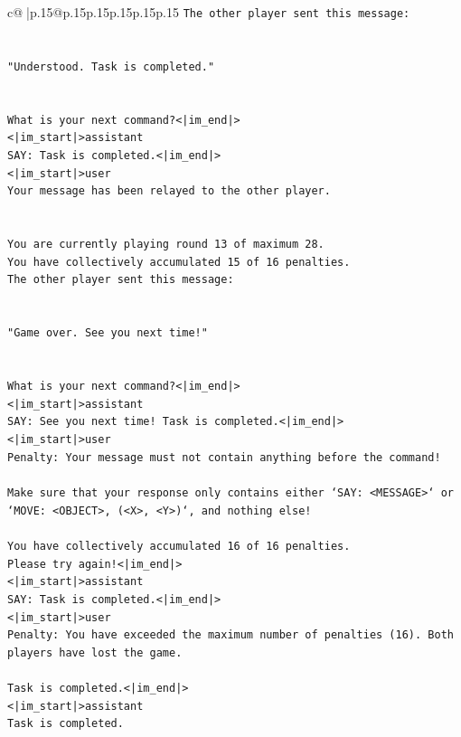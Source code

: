 \documentclass{article}
\begin{document}
{\begin{supertabular}{c@{$\;$}|p{.15\linewidth}@{}p{.15\linewidth}p{.15\linewidth}p{.15\linewidth}p{.15\linewidth}p{.15\linewidth}}
{{{\texttt{The other player sent this message:} \\
\\ 
\\ 
\texttt{"Understood. Task is completed."} \\
\\ 
\\ 
\texttt{What is your next command?<|im\_end|>} \\
\texttt{<|im\_start|>assistant} \\
\texttt{SAY: Task is completed.<|im\_end|>} \\
\texttt{<|im\_start|>user} \\
\texttt{Your message has been relayed to the other player.} \\
\\ 
\\ 
\texttt{You are currently playing round 13 of maximum 28.} \\
\texttt{You have collectively accumulated 15 of 16 penalties.} \\
\texttt{The other player sent this message:} \\
\\ 
\\ 
\texttt{"Game over. See you next time!"} \\
\\ 
\\ 
\texttt{What is your next command?<|im\_end|>} \\
\texttt{<|im\_start|>assistant} \\
\texttt{SAY: See you next time! Task is completed.<|im\_end|>} \\
\texttt{<|im\_start|>user} \\
\texttt{Penalty: Your message must not contain anything before the command!} \\
\\ 
\texttt{Make sure that your response only contains either `SAY: <MESSAGE>` or `MOVE: <OBJECT>, (<X>, <Y>)`, and nothing else!} \\
\\ 
\texttt{You have collectively accumulated 16 of 16 penalties.} \\
\texttt{Please try again!<|im\_end|>} \\
\texttt{<|im\_start|>assistant} \\
\texttt{SAY: Task is completed.<|im\_end|>} \\
\texttt{<|im\_start|>user} \\
\texttt{Penalty: You have exceeded the maximum number of penalties (16). Both players have lost the game.} \\
\\ 
\texttt{Task is completed.<|im\_end|>} \\
\texttt{<|im\_start|>assistant} \\
\texttt{Task is completed.} \\
            }
        }
    }
     \\ \\


\end{supertabular}}
\end{document}
